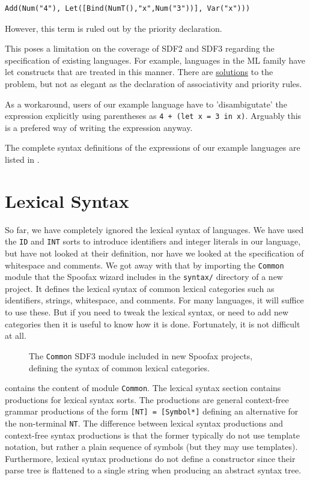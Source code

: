 \begin{lstlisting}[language=aterm]
Add(Num("4"), Let([Bind(NumT(),"x",Num("3"))], Var("x")))
\end{lstlisting}

However, this term is ruled out by the priority declaration. 

This poses a limitation on the coverage of SDF2 and SDF3 regarding the
specification of existing languages. For example, languages in the ML family
have let constructs that are treated in this manner. There are
\href{http://eelcovisser.org/post/244/disambiguating-if-expressions-in-sdf}{solutions}
to the problem, but not as elegant as the declaration of associativity and
priority rules.

As a workaround, users of our example language have to 'disambigutate' the
expression explicitly using parentheses as \texttt{4 + (let x = 3 in x)}.
Arguably this is a prefered way of writing the expression anyway.

The complete syntax definitions of the expressions of our example languages are
listed in .

\section{Lexical Syntax}

So far, we have completely ignored the lexical syntax of languages. We have used
the \texttt{ID} and \texttt{INT} sorts to introduce identifiers and integer
literals in our language, but have not looked at their definition, nor have we
looked at the specification of whitespace and comments. We got away with that by
importing the \texttt{Common} module that the Spoofax wizard includes in the
\texttt{syntax/} directory of a new project. It defines the lexical syntax of
common lexical categories such as identifiers, strings, whitespace, and
comments. For many languages, it will suffice to use these. But if you need to
tweak the lexical syntax, or need to add new categories then it is useful to
know how it is done. Fortunately, it is not difficult at all. 

\begin{figure}

\caption{The \texttt{Common} SDF3 module included in new Spoofax projects,
defining the syntax of common lexical categories.}
\end{figure}

 contains the content of module \texttt{Common}.
The lexical syntax section contains productions for lexical syntax sorts.
The productions are general context-free grammar productions of the form
\texttt{[NT] = [Symbol*]} defining an alternative for the non-terminal
\texttt{NT}. The difference between lexical syntax productions and context-free
syntax productions is that the former typically do not use template notation,
but rather a plain sequence of symbols (but they may use templates).
Furthermore, lexical syntax productions do not define a constructor since their
parse tree is flattened to a single string when producing an abstract syntax
tree.

